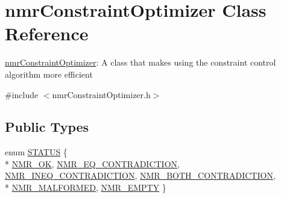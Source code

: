 \hypertarget{classnmr_constraint_optimizer}{\section{nmr\-Constraint\-Optimizer Class Reference}
\label{classnmr_constraint_optimizer}
}


\hyperlink{classnmr_constraint_optimizer}{nmr\-Constraint\-Optimizer}\-: A class that makes using the constraint control algorithm more efficient  




{\ttfamily \#include $<$nmr\-Constraint\-Optimizer.\-h$>$}

\subsection*{Public Types}
\begin{DoxyCompactItemize}
\item 
enum \hyperlink{classnmr_constraint_optimizer_ad46bf972892431d2c0a43a7099aec898}{S\-T\-A\-T\-U\-S} \{ \\*
\hyperlink{classnmr_constraint_optimizer_ad46bf972892431d2c0a43a7099aec898a03c26b81bdd26e621235c27816b489e9}{N\-M\-R\-\_\-\-O\-K}, 
\hyperlink{classnmr_constraint_optimizer_ad46bf972892431d2c0a43a7099aec898a24fba63a9b2e2a09a3cef637540da858}{N\-M\-R\-\_\-\-E\-Q\-\_\-\-C\-O\-N\-T\-R\-A\-D\-I\-C\-T\-I\-O\-N}, 
\hyperlink{classnmr_constraint_optimizer_ad46bf972892431d2c0a43a7099aec898a176272c7f4ac3938200f4d8009ed7c4d}{N\-M\-R\-\_\-\-I\-N\-E\-Q\-\_\-\-C\-O\-N\-T\-R\-A\-D\-I\-C\-T\-I\-O\-N}, 
\hyperlink{classnmr_constraint_optimizer_ad46bf972892431d2c0a43a7099aec898aa25395952bb1907f0f8911e4d197c04b}{N\-M\-R\-\_\-\-B\-O\-T\-H\-\_\-\-C\-O\-N\-T\-R\-A\-D\-I\-C\-T\-I\-O\-N}, 
\\*
\hyperlink{classnmr_constraint_optimizer_ad46bf972892431d2c0a43a7099aec898a7acddef3617730d0cb7579dea353593e}{N\-M\-R\-\_\-\-M\-A\-L\-F\-O\-R\-M\-E\-D}, 
\hyperlink{classnmr_constraint_optimizer_ad46bf972892431d2c0a43a7099aec898a74e422b788be448ad7fcdbc1f19234b7}{N\-M\-R\-\_\-\-E\-M\-P\-T\-Y}
 \}
\end{DoxyCompactItemize}
